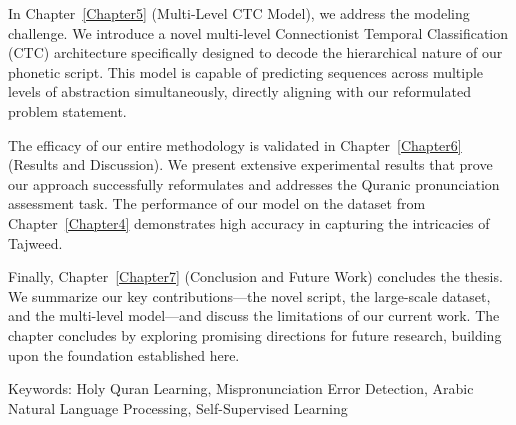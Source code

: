 In Chapter~\ref{Chapter5} (Multi-Level CTC Model), we address the modeling challenge. We introduce a novel multi-level Connectionist Temporal Classification (CTC) architecture specifically designed to decode the hierarchical nature of our phonetic script. This model is capable of predicting sequences across multiple levels of abstraction simultaneously, directly aligning with our reformulated problem statement.

The efficacy of our entire methodology is validated in Chapter~\ref{Chapter6} (Results and Discussion). We present extensive experimental results that prove our approach successfully reformulates and addresses the Quranic pronunciation assessment task. The performance of our model on the dataset from Chapter~\ref{Chapter4} demonstrates high accuracy in capturing the intricacies of Tajweed.

Finally, Chapter~\ref{Chapter7} (Conclusion and Future Work) concludes the thesis. We summarize our key contributions—the novel script, the large-scale dataset, and the multi-level model—and discuss the limitations of our current work. The chapter concludes by exploring promising directions for future research, building upon the foundation established here.


\vfill 

\begin{flushleft}
\large

Keywords: Holy Quran Learning, Mispronunciation Error Detection, Arabic Natural Language Processing, Self-Supervised Learning
\end{flushleft}



